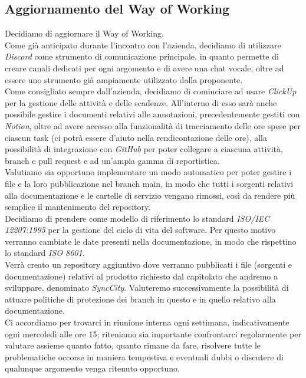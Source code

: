 \documentclass[italian,12pt]{article}
\begin{document}
\subsection{Aggiornamento del Way of Working}
Decidiamo di aggiornare il Way of Working. \\
Come già anticipato durante l'incontro con l'azienda, decidiamo di utilizzare \textit{Discord} come strumento di comunicazione principale, in quanto permette di creare canali dedicati per ogni argomento e di avere una chat vocale, oltre ad essere uno strumento già ampiamente utilizzato dalla proponente. \\
Come consigliato sempre dall'azienda, decidiamo di cominciare ad usare \textit{ClickUp} per la gestione delle attività e delle scadenze. All'interno di esso sarà anche possibile gestire i documenti relativi alle annotazioni, precedentemente gestiti con \textit{Notion}, oltre ad avere accesso alla funzionalità di tracciamento delle ore spese per ciascun task (ci potrà essere d'aiuto nella rendicontazione delle ore), alla possibilità di integrazione con \textit{GitHub} per poter collegare a ciascuna attività, branch e pull request e ad un'ampia gamma di reportistica. \\
Valutiamo sia opportuno implementare un modo automatico per poter gestire i file e la loro pubblicazione nel branch main, in modo che tutti i sorgenti relativi alla documentazione e le cartelle di servizio vengano rimossi, così da rendere più semplice il mantenimento del repository. \\
Decidiamo di prendere come modello di riferimento lo standard \textit{ISO/IEC 12207:1995} per la gestione del ciclo di vita del software. Per questo motivo verranno cambiate le date presenti nella documentazione, in modo che rispettino lo standard \textit{ISO 8601}. \\
Verrà creato un repository aggiuntivo dove verranno pubblicati i file (sorgenti e documentazione) relativi al prodotto 
richiesto dal capitolato che andremo a sviluppare, denominato \textit{SyncCity}. Valuteremo successivamente 
la possibilità di attuare politiche di protezione dei branch in questo e in quello relativo alla documentazione. \\
Ci accordiamo per trovarci in riunione interna ogni settimana, indicativamente ogni mercoledì alle ore 15; riteniamo sia importante confrontarci regolarmente per valutare assieme quanto fatto, quanto rimane da fare, risolvere tutte le problematiche occorse in maniera tempestiva e eventuali dubbi o discutere di qualunque argomento venga ritenuto opportuno.
\end{document}
